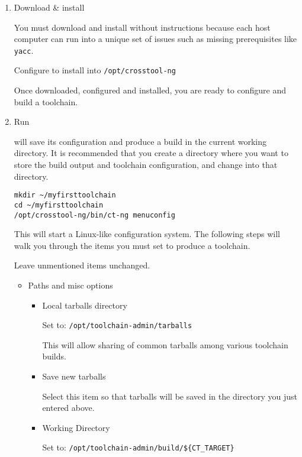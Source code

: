 \begin{enumerate}
\item Download \& install \ctng

  You must download and install \ctng without instructions because
  each host computer can run into a unique set of issues such as
  missing prerequisites like \texttt{yacc}.

  Configure \ctng to install into \texttt{/opt/crosstool-ng}

  Once downloaded, configured and installed, you are ready to
  configure and build a toolchain.

  \item Run \ctng

    \ctng will save its configuration and produce a build in the
    current working directory.  It is recommended that you create a
    directory where you want to store the build output and toolchain
    configuration, and change into that directory.

\begin{verbatim}
mkdir ~/myfirsttoolchain
cd ~/myfirsttoolchain
/opt/crosstool-ng/bin/ct-ng menuconfig
\end{verbatim}

    This will start a Linux-like configuration system.  The following
    steps will walk you through the items you must set to produce a
    toolchain.

    Leave unmentioned items unchanged.

    \begin{itemize}

    \item Paths and misc options

      \begin{itemize}
      \item{Local tarballs directory}

        Set to: \texttt{/opt/toolchain-admin/tarballs}

        This will allow sharing of common tarballs among various
        toolchain builds.

      \item{Save new tarballs}

        Select this item so that tarballs will be saved in the
        directory you just entered above.

      \item{Working Directory}

        Set to: \texttt{/opt/toolchain-admin/build/\$\{CT\_TARGET\}}


\end{itemize}
\end{itemize}
\end{enumerate}
